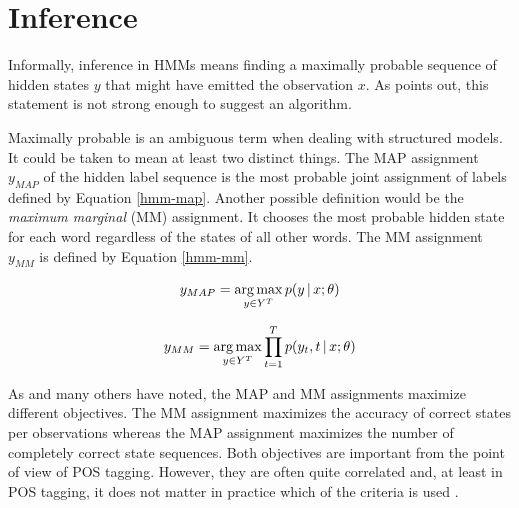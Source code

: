\section{Inference}
Informally, inference in HMMs means finding a maximally
probable sequence of hidden states $y$ that might have emitted the
observation $x$. As \cite{Rabiner1989} points out, this statement is
not strong enough to suggest an algorithm. 

Maximally probable is an ambiguous term when dealing with structured
models. It could be taken to mean at least two distinct things. The
MAP assignment $y_{MAP}$ of the hidden label sequence is the most
probable joint assignment of labels defined by Equation
\eqref{hmm-map}. Another possible definition would be the {\it maximum
  marginal} (MM) assignment. It chooses the most probable hidden
state for each word regardless of the states of all other words. The
MM assignment $y_{MM}$ is defined by Equation \eqref{hmm-mm}.

\begin{equation}
y_{MAP} = \operatorname*{arg\,max}_{y\in Y^T} p(y\mbox{$ \, | \, $} x\mbox{$ ; \, $}\theta)\label{hmm-map}
\end{equation}

\begin{equation}
y_{MM} = \operatorname*{arg\,max}_{y\in Y^T} \prod_{t = 1}^T p(y_t, t \mbox{$ \, | \, $} x\mbox{$ ; \, $}\theta)\label{hmm-mm}
\end{equation}

As \cite{Merialdo1994} and many others have noted, the MAP and MM
assignments maximize different objectives. The MM assignment maximizes
the accuracy of correct states per observations whereas the MAP
assignment maximizes the number of completely correct state
sequences. Both objectives are important from the point of view of POS
tagging. However, they are often quite correlated and, at least in
POS tagging, it does not matter in practice which of the criteria is
used \citep{Merialdo1994}.

